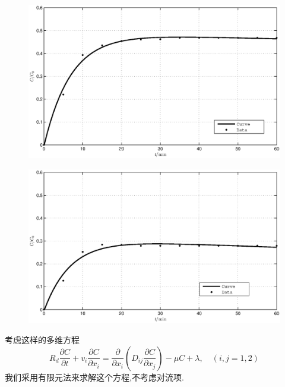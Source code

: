 \documentclass[xcolor=svgnames]{beamer} %
\begin{document}
\begin{frame}
\begin{figure}[h]
\centering
\includegraphics[scale=0.30]{./pic/dlfc.eps}
\end{figure}\par
\begin{figure}[h]
\centering
\includegraphics[scale=0.30]{./pic/dlfc2.eps}
\end{figure}
\end{frame}
\begin{frame}
考虑这样的多维方程
\begin{equation}\label{eq:sm_dw}
R_d\dfrac{\partial C}{\partial t}+v_i\dfrac{\partial C}{\partial x_i}=\dfrac{\partial}{\partial x_i}(D_{ij}\dfrac{\partial C}
{\partial x_j})-\mu C+\lambda,\quad (i,j=1,2)
\end{equation}
我们采用有限元法来求解这个方程,不考虑对流项.
\end{frame}
\end{document}
